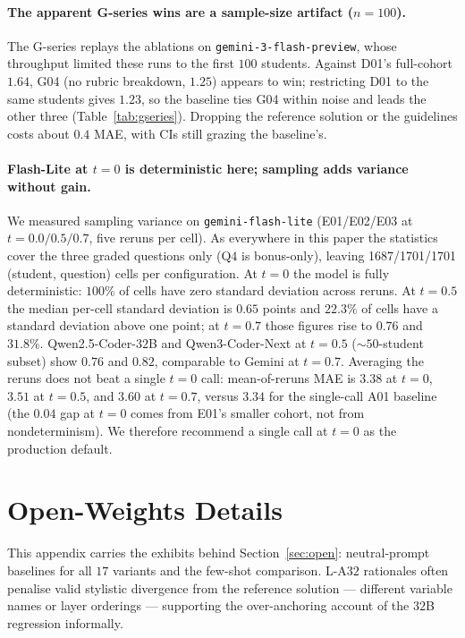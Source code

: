 \paragraph{The apparent G-series wins are a sample-size artifact ($n = 100$).}
\label{sec:closed:gseries}

The G-series replays the ablations on \texttt{gemini-3-flash-preview}, whose throughput limited these runs to the first $100$ students. Against D01's full-cohort $1.64$, G04 (no rubric breakdown, $1.25$) appears to win; restricting D01 to the same students gives $1.23$, so the baseline ties G04 within noise and leads the other three (Table~\ref{tab:gseries}). Dropping the reference solution or the guidelines costs about $0.4$ MAE, with CIs still grazing the baseline's.

\paragraph{Flash-Lite at $t = 0$ is deterministic here; sampling adds variance without gain.}
\label{sec:closed:variance}

We measured sampling variance on \texttt{gemini-flash-lite} (E01/E02/E03 at $t = 0.0/0.5/0.7$, five reruns per cell). As everywhere in this paper the statistics cover the three graded questions only (Q$4$ is bonus-only), leaving \num{1687}/\num{1701}/\num{1701} (student, question) cells per configuration. At $t = 0$ the model is fully deterministic: $100\%$ of cells have zero standard deviation across reruns. At $t = 0.5$ the median per-cell standard deviation is $0.65$ points and $22.3\%$ of cells have a standard deviation above one point; at $t = 0.7$ those figures rise to $0.76$ and $31.8\%$. Qwen2.5-Coder-$32$B and Qwen3-Coder-Next at $t = 0.5$ ($\sim 50$-student subset) show $0.76$ and $0.82$, comparable to Gemini at $t = 0.7$. Averaging the reruns does not beat a single $t = 0$ call: mean-of-reruns MAE is $3.38$ at $t = 0$, $3.51$ at $t = 0.5$, and $3.60$ at $t = 0.7$, versus $3.34$ for the single-call A01 baseline (the $0.04$ gap at $t = 0$ comes from E01's smaller cohort, not from nondeterminism). We therefore recommend a single call at $t = 0$ as the production default.

\clearpage
\section{Open-Weights Details}
\label{app:open}

This appendix carries the exhibits behind Section~\ref{sec:open}: neutral-prompt baselines for all $17$ variants and the few-shot comparison. L-A$32$ rationales often penalise valid stylistic divergence from the reference solution --- different variable names or layer orderings --- supporting the over-anchoring account of the $32$B regression informally.

